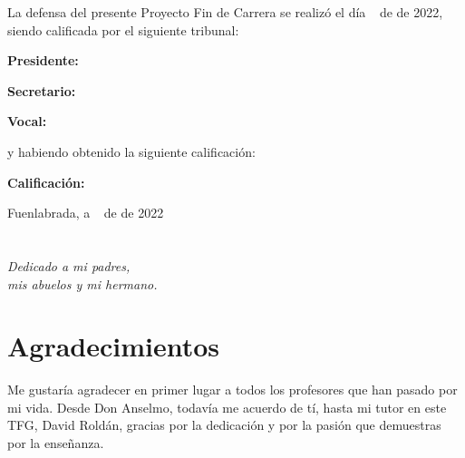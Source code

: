 \documentclass[a4paper, 12pt, oneside]{book}
\begin{document}
\vspace{1cm}
La defensa del presente Proyecto Fin de Carrera se realizó el día \qquad$\;\,$ de \qquad\qquad\qquad\qquad \newline de 2022, siendo calificada por el siguiente tribunal:


\vspace{0.5cm}
\textbf{Presidente:}

\vspace{1.2cm}
\textbf{Secretario:}

\vspace{1.2cm}
\textbf{Vocal:}


\vspace{1.2cm}
y habiendo obtenido la siguiente calificación:

\vspace{1cm}
\textbf{Calificación:}


\vspace{1cm}
\begin{flushright}
Fuenlabrada, a \qquad$\;\,$ de \qquad\qquad\qquad\qquad de 2022
\end{flushright}


\chapter*{}
\begin{flushright}
\textit{Dedicado a 
mi padres, \\
mis abuelos 
y mi hermano.}
\end{flushright}


\chapter*{Agradecimientos}

Me gustaría agradecer en primer lugar a todos los profesores que han pasado por mi vida. Desde Don Anselmo, todavía me acuerdo de tí, hasta mi tutor en este TFG, David Roldán, gracias por la dedicación y por la pasión que demuestras por la enseñanza.
\end{document}
